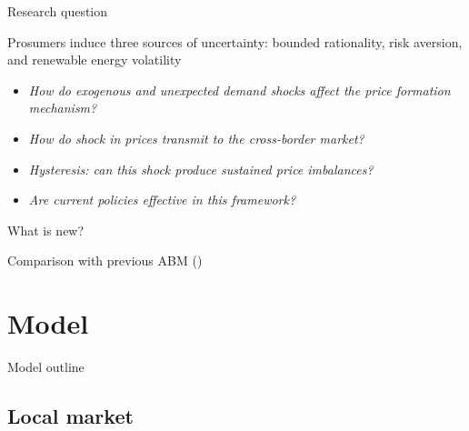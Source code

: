 \documentclass{beamer}
\begin{document}
\begin{frame}{Research question}

    Prosumers induce three sources of uncertainty: bounded rationality, risk aversion, and renewable energy volatility

    \begin{itemize} \setlength{\itemsep}{1em}
        \item \textit{How do exogenous and unexpected demand shocks affect the price formation mechanism?} \pause
        \item \textit{How do shock in prices transmit to the cross-border market?} \pause
        \item \textit{Hysteresis: can this shock produce sustained price imbalances?} \pause
        \item \textit{Are current policies effective in this framework?}
    \end{itemize}

\end{frame}

\begin{frame}{What is new?}

    Comparison with previous ABM (\cite{Weidlich2008})
    \vfill

    \hfill
\end{frame}

\section{Model}

\begin{frame}{Model outline}
    \centering
    \only<1>{
        \resizebox{\textwidth}{!}{}}
\end{frame}

\subsection{Local market}
\end{document}
